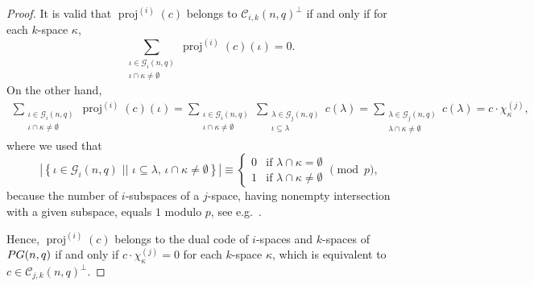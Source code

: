 \documentclass[a4paper]{article}
\theoremstyle{definition}
\newcommand{\sett}[2]{ \left\{ #1 \, \, || \, \, #2 \right \} }
\newcommand{\pg}{\textnormal{PG}}
\newcommand{\mc}{\mathcal C}
\newcommand{\mg}{\mathcal G}
\DeclareMathOperator{\proj}{proj}
\newcommand{\old}[1]{}%
\begin{document}
\old{\begin{proof}
 It is valid that $\proj(c)$ belongs to $\mc_{0,1}(3,q)^\perp$ if and only if for each line $\ell$,
 \[
  \sum_{P \in \ell} \proj(c)(P) = 0.
 \]
 On the other hand,
 \begin{align*}
  \sum_{P \in \ell} \proj(c)(P) 
  = \sum_{P \in \ell} \sum_{\substack{\ell' \in \mg_1(3,q) \\ P \in 
 \ell'}} c(\ell')
  = \sum_{\ell' \in \mg_1(3,q)} c(\ell') |\ell \cap \ell'|
  = \sum_{\substack{\ell' \in \mg_1(3,q) \\ \ell \cap \ell' \neq \emptyset}} c(\ell')
  = c \cdot \chi_\ell.
 \end{align*}
Hence, $\proj(c)$ belongs to the dual code of points and lines of $\pg(3,q)$ if and only if $c \cdot \chi_\ell = 0$ for each line $\ell$, which is equivalent to $c \in \mc(3,q)^\perp$.
\end{proof}}
\begin{proof}
 It is valid that $\proj^{(i)}(c)$ belongs to $\mc_{i,k}(n,q)^\perp$ if and only if for each \(k\)-space $\kappa$,
 \[
  \sum_{\substack{\iota\in\mg_i(n,q)\\\iota\cap\kappa\neq\emptyset}} \proj^{(i)}(c)(\iota) = 0.
 \]
 On the other hand,
 \begin{align*}
  \sum_{\substack{\iota\in\mg_i(n,q)\\\iota\cap\kappa\neq\emptyset}} \proj^{(i)}(c)(\iota) 
  = \sum_{\substack{\iota\in\mg_i(n,q)\\\iota\cap\kappa\neq\emptyset}} \sum_{\substack{\lambda\in\mg_j(n,q)\\\iota\subseteq\lambda}} c(\lambda)
  = \sum_{\substack{\lambda\in\mg_j(n,q)\\\lambda\cap\kappa\neq\emptyset}} c(\lambda)
  = c \cdot \chi_\kappa^{(j)},
 \end{align*}
 where we used that
 \[
  | \sett{ \iota \in \mg_i(n,q) }{ \iota \subseteq \lambda, \,  \iota \cap \kappa \neq \emptyset} | \equiv
  \begin{cases}
   0 & \text{if } \lambda \cap \kappa = \emptyset \\
   1 & \text{if } \lambda \cap \kappa \neq \emptyset
  \end{cases}
  \pmod p,
 \]
 because the number of \(i\)-subspaces of a \(j\)-space, having nonempty intersection with a given subspace, equals \(1\) modulo \(p\), see e.g.\ \cite[Lemma 3.2]{bcn}.
 
Hence, $\proj^{(i)}(c)$ belongs to the dual code of \(i\)-spaces and \(k\)-spaces of $\pg(n,q)$ if and only if $c \cdot \chi_\kappa^{(j)} = 0$ for each \(k\)-space $\kappa$, which is equivalent to $c \in \mc_{j,k}(n,q)^\perp$.
\end{proof}
\end{document}
